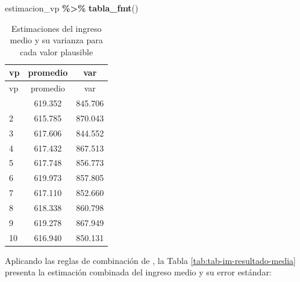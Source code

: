 \documentclass[
  spanish,
  12pt,
]{book}
\newenvironment{Shaded}{\begin{snugshade}}{\end{snugshade}}
\newcommand{\DecValTok}[1]{\textcolor[rgb]{0.00,0.00,0.81}{#1}}
\newcommand{\FunctionTok}[1]{\textcolor[rgb]{0.13,0.29,0.53}{\textbf{#1}}}
\newcommand{\NormalTok}[1]{#1}
\newcommand{\OtherTok}[1]{\textcolor[rgb]{0.56,0.35,0.01}{#1}}
\newcommand{\SpecialCharTok}[1]{\textcolor[rgb]{0.81,0.36,0.00}{\textbf{#1}}}
\begin{document}
\begin{Shaded}
\begin{Highlighting}[]
\NormalTok{estimacion\_vp }\SpecialCharTok{\%\textgreater{}\%} \FunctionTok{tabla\_fmt}\NormalTok{()}
\end{Highlighting}
\end{Shaded}

\begin{longtable}[]{@{}lcc@{}}
\caption{\label{tab:tab-vp-estimaciones}Estimaciones del ingreso medio y su varianza para cada valor plausible}\tabularnewline
\toprule\noalign{}
vp & promedio & var \\
\midrule\noalign{}
\endfirsthead
\toprule\noalign{}
vp & promedio & var \\
\midrule\noalign{}
\endhead
\bottomrule\noalign{}
\endlastfoot
1 & 619.352 & 845.706 \\
2 & 615.785 & 870.043 \\
3 & 617.606 & 844.552 \\
4 & 617.432 & 867.513 \\
5 & 617.748 & 856.773 \\
6 & 619.973 & 857.805 \\
7 & 617.110 & 852.660 \\
8 & 618.338 & 860.798 \\
9 & 619.278 & 867.949 \\
10 & 616.940 & 850.131 \\
\end{longtable}

Aplicando las reglas de combinación de \citet{rubin1987multiple}, la Tabla \ref{tab:tab-im-resultado-media} presenta la estimación combinada del ingreso medio y su error estándar:

\begin{Shaded}
\end{Shaded}
\end{document}
